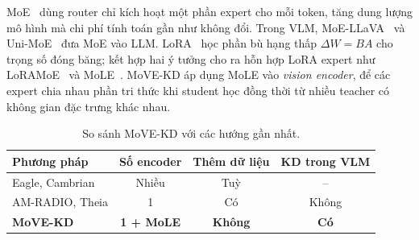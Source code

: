 MoE~\cite{jacobs1991adaptive,fedus2022switch} dùng router chỉ kích hoạt một phần expert cho mỗi token, tăng dung lượng mô hình mà chi phí tính toán gần như không đổi. Trong VLM, MoE-LLaVA~\cite{lin2024moellava} và Uni-MoE~\cite{li2024unimoe} đưa MoE vào LLM. LoRA~\cite{hu2022lora} học phần bù hạng thấp $\Delta W = BA$ cho trọng số đóng băng; kết hợp hai ý tưởng cho ra hỗn hợp LoRA expert như LoRAMoE~\cite{dou2024loramoe} và MoLE~\cite{wu2024mole}. MoVE-KD áp dụng MoLE vào \emph{vision encoder}, để các expert chia nhau phần tri thức khi student học đồng thời từ nhiều teacher có không gian đặc trưng khác nhau.

\begin{table}[t]
\centering
\footnotesize
\setlength{\tabcolsep}{4pt}
\caption{So sánh MoVE-KD với các hướng gần nhất.}
\label{tab:related}
\begin{tabularx}{\columnwidth}{@{}>{\raggedright\arraybackslash}X ccc@{}}
\toprule
Phương pháp & Số encoder & Thêm dữ liệu & KD trong VLM \\
\midrule
Eagle, Cambrian & Nhiều & Tuỳ & -- \\
AM-RADIO, Theia & 1 & Có & Không \\
\textbf{MoVE-KD} & \textbf{1 + MoLE} & \textbf{Không} & \textbf{Có} \\
\bottomrule
\end{tabularx}
\end{table}

